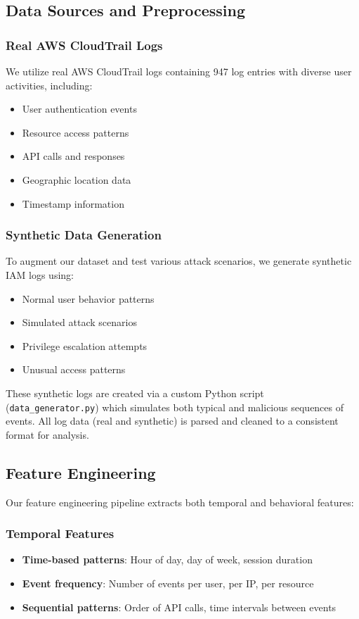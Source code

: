 \documentclass[conference]{IEEEtran}
\begin{document}
\subsection{Data Sources and Preprocessing}
\subsubsection{Real AWS CloudTrail Logs}
We utilize real AWS CloudTrail logs containing 947 log entries with diverse user activities, including:
\begin{itemize}
    \item User authentication events
    \item Resource access patterns
    \item API calls and responses
    \item Geographic location data
    \item Timestamp information
\end{itemize}

\subsubsection{Synthetic Data Generation}
To augment our dataset and test various attack scenarios, we generate synthetic IAM logs using:
\begin{itemize}
    \item Normal user behavior patterns
    \item Simulated attack scenarios
    \item Privilege escalation attempts
    \item Unusual access patterns
\end{itemize}
These synthetic logs are created via a custom Python script (\texttt{data\_generator.py}) which simulates both typical and malicious sequences of events. All log data (real and synthetic) is parsed and cleaned to a consistent format for analysis.

\subsection{Feature Engineering}
Our feature engineering pipeline extracts both temporal and behavioral features:

\subsubsection{Temporal Features}
\begin{itemize}
    \item \textbf{Time-based patterns}: Hour of day, day of week, session duration
    \item \textbf{Event frequency}: Number of events per user, per IP, per resource
    \item \textbf{Sequential patterns}: Order of API calls, time intervals between events
\end{itemize}
\end{document}
